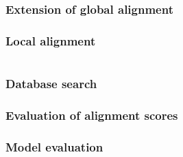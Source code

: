 \documentclass[12pt]{article}
\begin{document}
\section{Extension of global alignment}







\newpage

%
%
\setcounter{figure}{0}
\setcounter{table}{0}
\section{Local alignment}




\newpage

%
%
\part{}

%
%
\setcounter{figure}{0}
\setcounter{table}{0}
\section{Database search}







\newpage
%
%
\setcounter{figure}{0}
\setcounter{table}{0}
\section{Evaluation of alignment scores}






\newpage

%
%
\setcounter{figure}{0}
\setcounter{table}{0}
\section{Model evaluation}


\newpage


\end{document}
